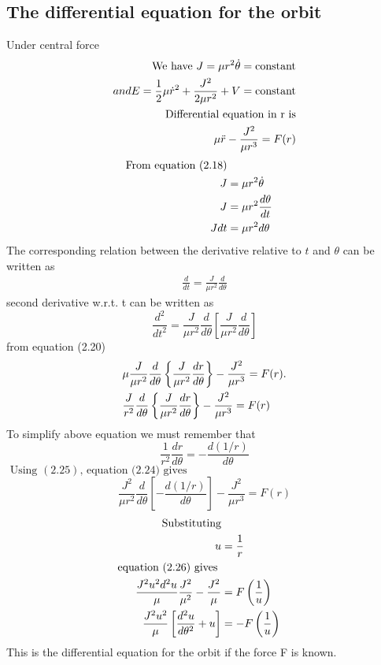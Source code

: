 \subsection{The differential equation for the orbit}
Under central force
\begin{align}
\text{We have }J=\mu r^{2} \dot{\theta}= \text{constant}\\
and E=\frac{1}{2} \mu \dot{r}^{2}+\frac{J^{2}}{2 \mu r^{2}}+V= \text{constant}\\
\text{Differential equation in r is} \notag\\
\mu \ddot{r}-\frac{J^{2}}{\mu r^{3}}=F(r)
\end{align}
\begin{align}
\text{From equation (2.18)}\notag\\
	J&=\mu r^{2} \dot{\theta}\notag  \\
	J&=\mu r^{2} \frac{d \theta}{d t}\notag \\ 
	J d t&=\mu r^{2} d \theta
\end{align}
The corresponding relation between the derivative relative to $t$ and $\theta$ can be written as
\begin{align}
\frac{d}{d t}=\frac{J}{\mu r^{2}} \frac{d}{d \theta}
\end{align}
second derivative w.r.t. t can be written as \\
\begin{equation}
\frac{d^{2}}{d t^{2}}=\frac{J}{\mu r^{2}} \frac{d}{d \theta}\left[\frac{J}{\mu r^{2}} \frac{d}{d \theta}\right]
\end{equation}
from equation (2.20)
\begin{align}
	&\mu \frac{J}{\mu r^{2}} \frac{d}{d \theta}\left\{\frac{J}{\mu r^{2}} \frac{d r}{d \theta}\right\}-\frac{J^{2}}{\mu r^{3}}=F(r) . \notag \\
	&\frac{J}{r^{2}} \frac{d}{d \theta}\left\{\frac{J}{\mu r^{2}} \frac{d r}{d \theta}\right\}-\frac{J^{2}}{\mu r^{3}}=F(r)
\end{align}
To simplify above equation we must remember that
\begin{equation}
\frac{1}{r^{2}} \frac{d r}{d \theta}=-\frac{d(1 / r)}{d \theta}
\end{equation}
$\text { Using }(2.25) \text {, equation (2.24) gives }$
\begin{equation}
\frac{J^{2}}{\mu r^{2}} \frac{d}{d \theta}\left[-\frac{d(1 / r)}{d \theta}\right]-\frac{J^{2}}{\mu r^{3}}=F(r)
\end{equation}
\begin{align}
\text{Substituting}\\
u&=\frac{1}{r}\\
\text{equation (2.26) gives }\\
	\-\frac{J^{2} u^{2} d^{2} u}{\mu} \frac{J^{2}}{\mu^{2}}-\frac{J^{2}}{\mu}&=F\left(\frac{1}{u}\right) \notag \\
	\frac{J^{2} u^{2}}{\mu}\left[\frac{d^{2} u}{d \theta^{2}}+u\right]&=-F\left(\frac{1}{u}\right)
\end{align}
This is the differential equation for the orbit if the force F is known.
